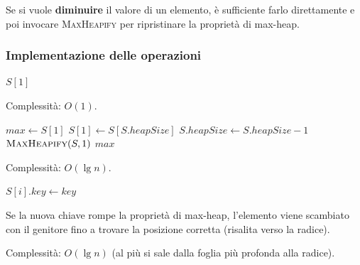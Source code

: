 \begin{nota}
	Se si vuole \textbf{diminuire} il valore di un elemento, è sufficiente
	farlo direttamente e poi invocare \textsc{MaxHeapify} per ripristinare
	la proprietà di max-heap.
\end{nota}

\subsubsection{Implementazione delle operazioni}

\begin{algorithm}[H]
	\caption{\textsc{Max}$(S)$}
	\Return $S[1]$\;
\end{algorithm}

Complessità: $O(1)$.

\begin{algorithm}[H]
	\caption{\textsc{ExtractMax}$(S)$}
	$\mathit{max} \gets S[1]$\;
	$S[1] \gets S[S.\mathit{heapSize}]$\;
	$S.\mathit{heapSize} \gets S.\mathit{heapSize} - 1$\;
	$\textsc{MaxHeapify}(S, 1)$\;
	\Return $\mathit{max}$\;
\end{algorithm}

Complessità: $O(\lg n)$.

\begin{algorithm}[H]
	\caption{\textsc{IncreaseKey}$(S, i, \mathit{key})$}
	$S[i].\mathit{key} \gets \mathit{key}$\;
\end{algorithm}

\begin{softnote}
	Se la nuova chiave rompe la proprietà di max-heap, l'elemento viene
	scambiato con il genitore fino a trovare la posizione corretta
	(risalita verso la radice).
\end{softnote}

Complessità: $O(\lg n)$ (al più si sale dalla foglia più profonda
alla radice).

